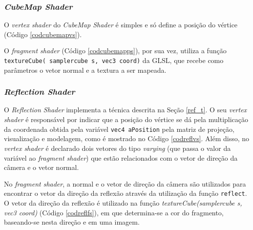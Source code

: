 \subsubsection{\textit{CubeMap Shader}}	

	 O \textit{vertex shader} do \textit{CubeMap Shader} é simples e só define a posição do vértice (Código \ref{codcubemapvs}). 

	

	O  \textit{fragment shader} (Código \ref{codcubemapps}), por sua vez, utiliza a função \texttt{textureCube( samplercube s, vec3 coord)} da GLSL, que recebe como parâmetros o vetor normal e a textura a ser mapeada. 

	
	
\subsubsection{\textit{Reflection Shader}}

	O \textit{Reflection Shader} implementa a técnica descrita na Seção \ref{ref_t}. O seu \textit{vertex shader} é responsável por indicar que a posição do vértice se dá pela multiplicação da coordenada obtida pela variável \texttt{vec4 aPosition} pela matriz de projeção, visualização e modelagem, como é mostrado no Código \ref{codreflvs}. Além disso, no \textit{vertex shader} é declarado dois vetores do tipo \textit{varying} (que passa o valor da variável ao \textit{fragment shader}) que estão relacionados com o vetor de direção da câmera e o vetor normal. 

	

	No \textit{fragment shader}, a normal e o vetor de direção da câmera são utilizados para encontrar o vetor da direção da reflexão através da utilização da função \texttt{reflect}. O vetor da direção da reflexão é utilizado na função \textit{textureCube(samplercube s, vec3 coord)} (Código \ref{codreflfs}), em que determina-se a cor do fragmento, baseando-se nesta direção e em uma imagem. 

	

